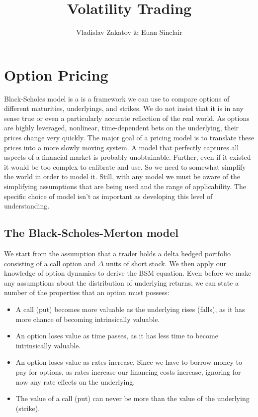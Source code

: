 \documentclass[11pt]{report}
\begin{document}
\title{Volatility Trading}
\author{Vladislav Zakatov \& Euan Sinclair}
\date{}
\maketitle

\tableofcontents

\chapter{Option Pricing}

	Black-Scholes model is a is a framework we can use to compare options of different maturities, underlyings, and strikes. We do not insist that it is in any sense true or even a particularly accurate reflection of the real world. As options are highly leveraged, nonlinear, time-dependent bets on the underlying, their prices change very quickly. The major goal of a pricing model is to translate these prices into a more slowly moving system. A model that perfectly captures all aspects of a financial market is probably unobtainable. Further, even if it existed it would be too complex to calibrate and use. So we need to somewhat simplify the world in order to model it. Still, with any model we must be aware of the simplifying assumptions that are being used and the range of applicability. The specific choice of model isn’t as important as developing this level of understanding.

	\section{The Black-Scholes-Merton model}

		We start from the assumption that a trader holds a delta hedged portfolio consisting of a call option and $\Delta$ units of short stock. We then apply our knowledge of option dynamics to derive the BSM equation. Even before we make any assumptions about the distribution of underlying returns, we can state a number of the properties that an option must possess:
		\begin{itemize}
			\item A call (put) becomes more valuable as the underlying rises (falls), as it has more chance of becoming intrinsically valuable.
			\item An option loses value as time passes, as it has less time to become intrinsically valuable.
			\item An option loses value as rates increase. Since we have to borrow money to pay for options, as rates increase our financing costs increase, ignoring for now any rate effects on the underlying.
			\item The value of a call (put) can never be more than the value of the underlying (strike).
		\end{itemize}
\end{document}
